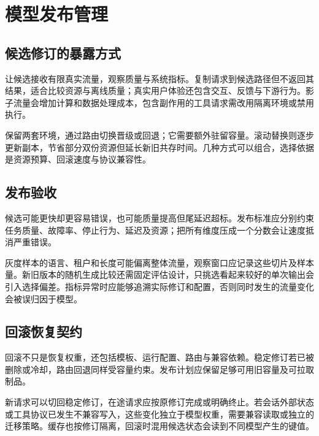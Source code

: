 \documentclass[../textbook.tex]{subfiles}
\begin{document}

\section{模型发布管理}

\subsection{候选修订的暴露方式}
让候选接收有限真实流量，观察质量与系统指标。复制请求到候选路径但不返回其结果，适合比较资源与离线质量；真实用户体验还包含交互、反馈与下游行为。影子流量会增加计算和数据处理成本，包含副作用的工具请求需改用隔离环境或禁用执行。

保留两套环境，通过路由切换晋级或回退；它需要额外驻留容量。滚动替换则逐步更新副本，节省部分双份资源但延长新旧共存时间。几种方式可以组合，选择依据是资源预算、回滚速度与协议兼容性。

\subsection{发布验收}
候选可能更快却更容易错误，也可能质量提高但尾延迟超标。发布标准应分别约束任务质量、故障率、停止行为、延迟及资源；把所有维度压成一个分数会让速度抵消严重错误。

灰度样本的语言、租户和长度可能偏离整体流量，观察窗口应记录这些切片及样本量。新旧版本的随机生成比较还需固定评估设计，只挑选看起来较好的单次输出会引入选择偏差。指标异常时应能够追溯实际修订和配置，否则同时发生的流量变化会被误归因于模型。

\subsection{回滚恢复契约}
回滚不只是恢复权重，还包括模板、运行配置、路由与兼容依赖。稳定修订若已被删除或冷却，路由回退同样受容量约束。发布计划应保留足够可用旧容量及可拉取制品。

新请求可以切回稳定修订，在途请求应按原修订完成或明确终止。若会话外部状态或工具协议已发生不兼容写入，这些变化独立于模型权重，需要兼容读取或独立的迁移策略。缓存也按修订隔离，回滚时混用候选状态会读到不同模型产生的键值。
\end{document}
